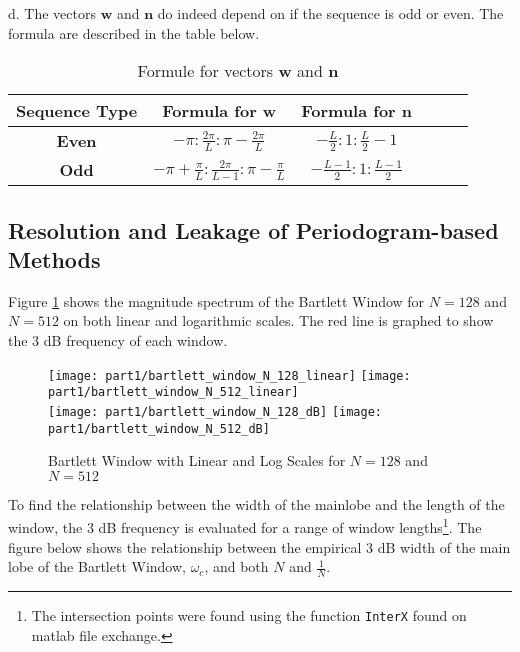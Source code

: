\noindent{}d. The vectors $\textbf{w}$ and $\textbf{n}$ do indeed depend on if the sequence is odd or even. The formula are described in the table below.

\begin{table}[H]
\tabulinesep=0.9mm
\centering
    \begin{tabu}{|c|c|c|c|c|c|}
        \hline
        \textbf{Sequence Type} & \textbf{Formula for $\textbf{w}$} & \textbf{Formula for $\textbf{n}$} \\
        \hline
        \textbf{Even} & $-\pi:\frac{2\pi}{L}:\pi-\frac{2\pi}{L}$ & $-\frac{L}{2}:1:\frac{L}{2}-1$ \\
        \hline
        \textbf{Odd} & $-\pi+\frac{\pi}{L}:\frac{2\pi}{L-1}:\pi-\frac{\pi}{L}$ & $-\frac{L-1}{2}:1:\frac{L-1}{2}$ \\
        \hline
    \end{tabu}%
  \caption{Formule for vectors $\textbf{w}$ and $\textbf{n}$}
\end{table}%


\subsection{Resolution and Leakage of Periodogram-based Methods}


\noindent{}Figure \ref{fig:bartlett_window_log_linear} shows the magnitude spectrum of the Bartlett Window for $N=128$ and $N=512$ on both linear and logarithmic scales. The red line is graphed to show the 3 dB frequency of each window. 

\begin{figure}[H]
\centering{}
\texttt{[image: part1/bartlett\_window\_N\_128\_linear]}
\texttt{[image: part1/bartlett\_window\_N\_512\_linear]} \\
\texttt{[image: part1/bartlett\_window\_N\_128\_dB]}
\texttt{[image: part1/bartlett\_window\_N\_512\_dB]}
\caption{Bartlett Window with Linear and Log Scales for $N=128$ and $N=512$}
\label{fig:bartlett_window_log_linear}
\end{figure}

\noindent{}To find the relationship between the width of the mainlobe and the length of the window, the 3 dB frequency is evaluated for a range of window lengths\footnote{The intersection points were found using the function \texttt{InterX} found on matlab file exchange.}. The figure below shows the relationship between the empirical 3 dB width of the main lobe of the Bartlett Window, $\omega_{c}$, and both $N$ and $\frac{1}{N}$. 

